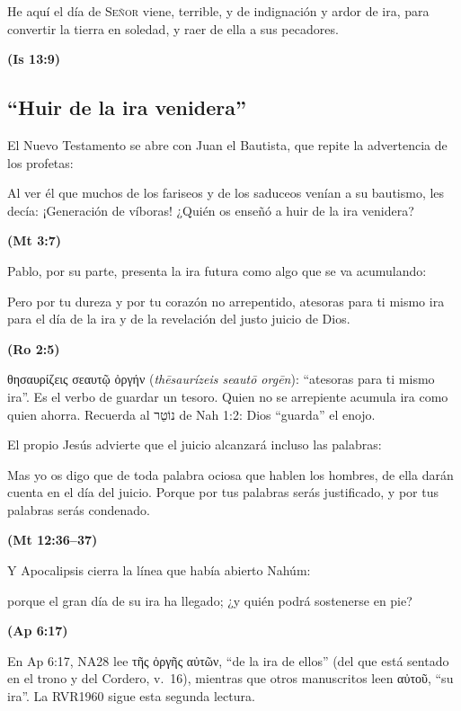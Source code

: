 \documentclass[11pt,letterpaper]{article}
\newcommand{\heb}[1]{\mbox{\foreignlanguage{hebrew}{#1}}}
\newcommand{\grc}[1]{\foreignlanguage{ancientgreek}{#1}}
\newcommand{\SENOR}{\textsc{Señor}}
\newcommand{\fuente}[1]{\par\hfill{\upshape\bfseries\small\textcolor{azul}{#1}}}
\begin{document}
\begin{cita}He aquí el día de \SENOR{} viene, terrible, y de indignación y ardor de ira, para convertir la tierra en soledad, y raer de ella a sus pecadores.\fuente{(Is 13:9)}\end{cita}

\subsection{``Huir de la ira venidera''}
El Nuevo Testamento se abre con Juan el Bautista, que repite la advertencia de los profetas:

\begin{cita}Al ver él que muchos de los fariseos y de los saduceos venían a su bautismo, les decía: ¡Generación de víboras! ¿Quién os enseñó a huir de la ira venidera?\fuente{(Mt 3:7)}\end{cita}

Pablo, por su parte, presenta la ira futura como algo que se va acumulando:

\begin{cita}Pero por tu dureza y por tu corazón no arrepentido, atesoras para ti mismo ira para el día de la ira y de la revelación del justo juicio de Dios.\fuente{(Ro 2:5)}\end{cita}

\begin{filologia}[Ro 2:5]
\grc{θησαυρίζεις σεαυτῷ ὀργήν} (\emph{thēsaurízeis seautō orgēn}): ``atesoras para ti mismo ira''. Es el verbo de guardar un tesoro. Quien no se arrepiente acumula ira como quien ahorra. Recuerda al \heb{נוֹטֵר} de Nah 1:2: Dios ``guarda'' el enojo.
\end{filologia}

El propio Jesús advierte que el juicio alcanzará incluso las palabras:

\begin{cita}Mas yo os digo que de toda palabra ociosa que hablen los hombres, de ella darán cuenta en el día del juicio. Porque por tus palabras serás justificado, y por tus palabras serás condenado.\fuente{(Mt 12:36--37)}\end{cita}

Y Apocalipsis cierra la línea que había abierto Nahúm:

\begin{cita}porque el gran día de su ira ha llegado; ¿y quién podrá sostenerse en pie?\fuente{(Ap 6:17)}\end{cita}

\begin{nota}
En Ap 6:17, NA28 lee \grc{τῆς ὀργῆς αὐτῶν}, ``de la ira de ellos'' (del que está sentado en el trono y del Cordero, v.~16), mientras que otros manuscritos leen \grc{αὐτοῦ}, ``su ira''. La RVR1960 sigue esta segunda lectura.
\end{nota}
\end{document}
